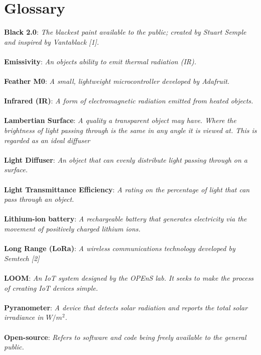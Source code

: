 \documentclass[10pt,draftclsnofoot,onecolumn,letterpaper]{article}
\begin{document}
\section{Glossary}
\textbf{Black 2.0}: \textit{The blackest paint available to the public; created by Stuart Semple and inspired by Vantablack [1].}\\\\
\textbf{Emissivity}: \textit{An objects ability to emit thermal radiation (IR).}\\\\
\textbf{Feather M0}: \textit{A small, lightweight microcontroller developed by Adafruit.}\\\\
\textbf{Infrared (IR)}: \textit{A form of electromagnetic radiation emitted from heated objects.}\\\\
\textbf{Lambertian Surface}: \textit{ A quality a transparent object may have. Where the brightness of light passing through is the same in any angle it is viewed at. This is regarded as an ideal diffuser}\\\\
\textbf{Light Diffuser}: \textit{An object that can evenly distribute light passing through on a surface.}\\\\
\textbf{Light Transmittance Efficiency}: \textit{A rating on the percentage of light that can pass through an object.}\\\\
\textbf{Lithium-ion battery}: \textit{A rechargeable battery that generates electricity via the movement of positively charged lithium ions.}\\\\
\textbf{Long Range (LoRa)}: \textit{A wireless communications technology developed by Semtech [2]}\\\\
\textbf{LOOM}: \textit{An IoT system designed by the OPEnS lab. It seeks to make the process of creating IoT devices simple.}\\\\
\textbf{Pyranometer}: \textit{A device that detects solar radiation and reports the total solar irradiance in $W/m^2$.}\\\\
\textbf{Open-source}: \textit{Refers to software and code being freely available to the general public.}\\\\
\end{document}

